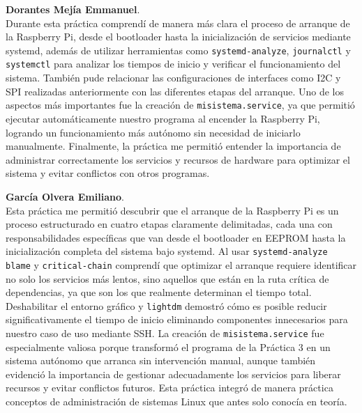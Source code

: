 \documentclass[conference]{IEEEtran}
\begin{document}
\textbf{Dorantes Mejía Emmanuel}. \\
Durante esta práctica comprendí de manera más clara el proceso de arranque de la Raspberry Pi, desde el bootloader hasta la inicialización de servicios mediante systemd, además de utilizar herramientas como \texttt{systemd-analyze}, \texttt{journalctl} y \texttt{systemctl} para analizar los tiempos de inicio y verificar el funcionamiento del sistema. También pude relacionar las configuraciones de interfaces como I2C y SPI realizadas anteriormente con las diferentes etapas del arranque. Uno de los aspectos más importantes fue la creación de \texttt{misistema.service}, ya que permitió ejecutar automáticamente nuestro programa al encender la Raspberry Pi, logrando un funcionamiento más autónomo sin necesidad de iniciarlo manualmente. Finalmente, la práctica me permitió entender la importancia de administrar correctamente los servicios y recursos de hardware para optimizar el sistema y evitar conflictos con otros programas.

\textbf{García Olvera Emiliano}. \\
Esta práctica me permitió descubrir que el arranque de la Raspberry Pi es un proceso estructurado en cuatro etapas claramente delimitadas, cada una con responsabilidades específicas que van desde el bootloader en EEPROM hasta la inicialización completa del sistema bajo systemd. Al usar \texttt{systemd-analyze blame} y \texttt{critical-chain} comprendí que optimizar el arranque requiere identificar no solo los servicios más lentos, sino aquellos que están en la ruta crítica de dependencias, ya que son los que realmente determinan el tiempo total. Deshabilitar el entorno gráfico y \texttt{lightdm} demostró cómo es posible reducir significativamente el tiempo de inicio eliminando componentes innecesarios para nuestro caso de uso mediante SSH. La creación de \texttt{misistema.service} fue especialmente valiosa porque transformó el programa de la Práctica 3 en un sistema autónomo que arranca sin intervención manual, aunque también evidenció la importancia de gestionar adecuadamente los servicios para liberar recursos y evitar conflictos futuros. Esta práctica integró de manera práctica conceptos de administración de sistemas Linux que antes solo conocía en teoría.
\end{document}
